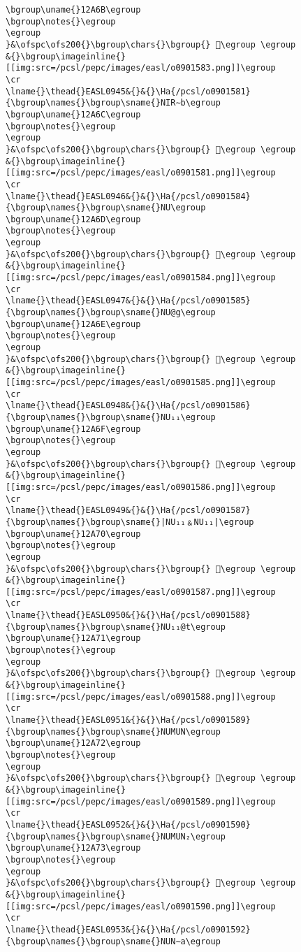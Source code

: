 \begin{verbatim}
\bgroup\uname{}12A6B\egroup
\bgroup\notes{}\egroup
\egroup
}&\ofspc\ofs200{}\bgroup\chars{}\bgroup{} 𒩫\egroup \egroup
&{}\bgroup\imageinline{}[[img:src=/pcsl/pepc/images/easl/o0901583.png]]\egroup
\cr
\lname{}\thead{}EASL0945&{}&{}\Ha{/pcsl/o0901581}{\bgroup\names{}\bgroup\sname{}NIR∼b\egroup
\bgroup\uname{}12A6C\egroup
\bgroup\notes{}\egroup
\egroup
}&\ofspc\ofs200{}\bgroup\chars{}\bgroup{} 𒩬\egroup \egroup
&{}\bgroup\imageinline{}[[img:src=/pcsl/pepc/images/easl/o0901581.png]]\egroup
\cr
\lname{}\thead{}EASL0946&{}&{}\Ha{/pcsl/o0901584}{\bgroup\names{}\bgroup\sname{}NU\egroup
\bgroup\uname{}12A6D\egroup
\bgroup\notes{}\egroup
\egroup
}&\ofspc\ofs200{}\bgroup\chars{}\bgroup{} 𒩭\egroup \egroup
&{}\bgroup\imageinline{}[[img:src=/pcsl/pepc/images/easl/o0901584.png]]\egroup
\cr
\lname{}\thead{}EASL0947&{}&{}\Ha{/pcsl/o0901585}{\bgroup\names{}\bgroup\sname{}NU@g\egroup
\bgroup\uname{}12A6E\egroup
\bgroup\notes{}\egroup
\egroup
}&\ofspc\ofs200{}\bgroup\chars{}\bgroup{} 𒩮\egroup \egroup
&{}\bgroup\imageinline{}[[img:src=/pcsl/pepc/images/easl/o0901585.png]]\egroup
\cr
\lname{}\thead{}EASL0948&{}&{}\Ha{/pcsl/o0901586}{\bgroup\names{}\bgroup\sname{}NU₁₁\egroup
\bgroup\uname{}12A6F\egroup
\bgroup\notes{}\egroup
\egroup
}&\ofspc\ofs200{}\bgroup\chars{}\bgroup{} 𒩯\egroup \egroup
&{}\bgroup\imageinline{}[[img:src=/pcsl/pepc/images/easl/o0901586.png]]\egroup
\cr
\lname{}\thead{}EASL0949&{}&{}\Ha{/pcsl/o0901587}{\bgroup\names{}\bgroup\sname{}|NU₁₁﹠NU₁₁|\egroup
\bgroup\uname{}12A70\egroup
\bgroup\notes{}\egroup
\egroup
}&\ofspc\ofs200{}\bgroup\chars{}\bgroup{} 𒩰\egroup \egroup
&{}\bgroup\imageinline{}[[img:src=/pcsl/pepc/images/easl/o0901587.png]]\egroup
\cr
\lname{}\thead{}EASL0950&{}&{}\Ha{/pcsl/o0901588}{\bgroup\names{}\bgroup\sname{}NU₁₁@t\egroup
\bgroup\uname{}12A71\egroup
\bgroup\notes{}\egroup
\egroup
}&\ofspc\ofs200{}\bgroup\chars{}\bgroup{} 𒩱\egroup \egroup
&{}\bgroup\imageinline{}[[img:src=/pcsl/pepc/images/easl/o0901588.png]]\egroup
\cr
\lname{}\thead{}EASL0951&{}&{}\Ha{/pcsl/o0901589}{\bgroup\names{}\bgroup\sname{}NUMUN\egroup
\bgroup\uname{}12A72\egroup
\bgroup\notes{}\egroup
\egroup
}&\ofspc\ofs200{}\bgroup\chars{}\bgroup{} 𒩲\egroup \egroup
&{}\bgroup\imageinline{}[[img:src=/pcsl/pepc/images/easl/o0901589.png]]\egroup
\cr
\lname{}\thead{}EASL0952&{}&{}\Ha{/pcsl/o0901590}{\bgroup\names{}\bgroup\sname{}NUMUN₂\egroup
\bgroup\uname{}12A73\egroup
\bgroup\notes{}\egroup
\egroup
}&\ofspc\ofs200{}\bgroup\chars{}\bgroup{} 𒩳\egroup \egroup
&{}\bgroup\imageinline{}[[img:src=/pcsl/pepc/images/easl/o0901590.png]]\egroup
\cr
\lname{}\thead{}EASL0953&{}&{}\Ha{/pcsl/o0901592}{\bgroup\names{}\bgroup\sname{}NUN∼a\egroup

\end{verbatim}
